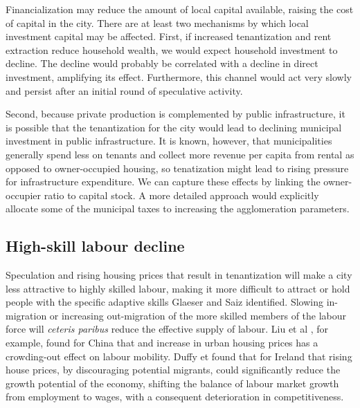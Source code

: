 Financialization may reduce the amount of local capital available, raising the cost of capital in the city. 
There are at least two mechanisms by which local investment capital may be affected. First, if increased tenantization and rent extraction reduce household wealth, we would expect household investment to decline. The decline would probably be correlated with a decline in direct investment, amplifying its effect. Furthermore, this channel would act very slowly and persist after an initial round of speculative activity. 

Second, because private production is complemented by public infrastructure, it is possible that the tenantization for the city would lead to declining municipal investment in public infrastructure. It is known, however, that municipalities generally spend less on tenants and collect more revenue per capita from rental as opposed to owner-occupied housing, so tenatization might lead to rising pressure for infrastructure expenditure.  We can capture these effects by linking the owner-occupier ratio to capital stock. A more detailed approach would explicitly allocate some of the municipal taxes to increasing the agglomeration parameters.


\subsection{High-skill labour decline}

 Speculation and rising housing prices that result in tenantization will make a city less attractive to highly skilled labour, making it more difficult to attract or hold people with the specific adaptive skills Glaeser and Saiz \cite{glaeserRiseSkilledCity2003} identified. Slowing in-migration or increasing out-migration of the more skilled members of the labour force  will \textit{ceteris paribus} reduce the effective supply of labour. 
Liu et al \cite{liuImpactUrbanHousing2023}, for example, found for China that and increase in urban housing prices has a crowding-out effect on labour mobility.  Duffy et  \cite{duffyRisingHousePrices2005} found that for Ireland that rising house prices, by discouraging potential migrants, could significantly reduce the growth potential of the economy, shifting the balance of labour market growth from employment to wages, with a consequent deterioration in competitiveness. %

